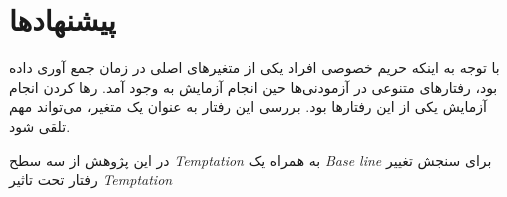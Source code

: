 \section{پیشنهادها}
با  توجه به اینکه  حریم خصوصی افراد یکی از متغیر‌های اصلی در زمان جمع آوری
داده بود، رفتار‌های متنوعی در آزمودنی‌ها حین انجام آزمایش به وجود
آمد. رها کردن انجام آزمایش یکی از این رفتار‌ها
بود. بررسی این رفتار به عنوان یک متغیر، می‌تواند مهم تلقی شود.

در این پژوهش از سه سطح 
\textit{
    \gls{Temptation}
}
به همراه یک 
\textit{
    \gls{Base line}
}
برای سنجش تغییر رفتار تحت تاثیر 
\!\textit{
    \gls{Temptation}
}

